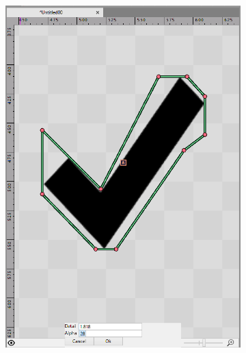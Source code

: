 \documentclass{fefu_thesis/cls/fefu}
\begin{document}
\begin{figure}[H]
\begin{subfigure}{.32\linewidth}
            \includegraphics[scale=0.25]{images/Check1.png}
        \end{subfigure}
        \begin{subfigure}{.32\linewidth}
            \centering

\end{subfigure}
\end{figure}
\end{document}
